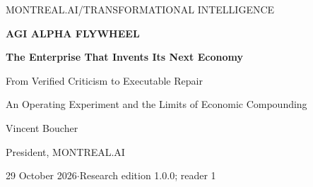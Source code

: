 \documentclass[11pt,letterpaper]{article}
\begin{document}
\thispagestyle{plain}
\begin{center}
{\small MONTREAL.AI\quad /\quad TRANSFORMATIONAL INTELLIGENCE}\par\vspace{0.7em}
{\fontsize{25}{29}\selectfont\bfseries AGI ALPHA FLYWHEEL}\par\vspace{0.35em}
{\Large\bfseries The Enterprise That Invents Its Next Economy}\par\vspace{0.6em}
{\large From Verified Criticism to Executable Repair}\par
{\normalsize An Operating Experiment and the Limits of Economic Compounding}\par\vspace{0.8em}
{\large Vincent Boucher}\par
President, MONTREAL.AI\par\vspace{0.4em}
29 October 2026\quad$\cdot$\quad Research edition 1.0.0; reader 1\par
\end{center}

\clearpage\begingroup\small\setlength{\parskip}{0pt}\tableofcontents\endgroup\clearpage

\end{document}
